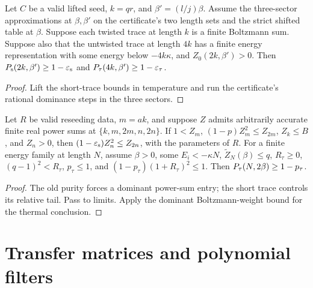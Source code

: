 \begin{theorem}
  \label{thm:seed-lifted}
  \leanok
  Let \(C\) be a valid lifted seed, \(k=qr\), and \(\beta'=(l/j)\beta\).
  Assume the three-sector approximations at \(\beta,\beta'\) on the certificate's two length
  sets and the strict shifted table at \(\beta\).
  Suppose each twisted trace at length \(k\) is a finite Boltzmann sum.
  Suppose also that the untwisted trace at length \(4k\) has a finite energy representation
  with some energy below \(-4k\kappa\), and \(Z_0(2k,\beta')>0\).
  Then \(P_{\mathrm{s}}(2k,\beta')\ge1-\varepsilon_{\mathrm{s}}\) and \(P_{\tau}(4k,\beta')\ge1-\varepsilon_{\tau}\).
\end{theorem}
\begin{proof}
  \leanok
  Lift the short-trace bounds in temperature and run the certificate's rational dominance
  steps in the three sectors.
\end{proof}

\begin{theorem}
  \label{thm:seed-reseed}
  \leanok
  Let \(R\) be valid reseeding data, \(m=ak\), and suppose \(Z\) admits arbitrarily accurate
  finite real power sums at \(\{k,m,2m,n,2n\}\).
  If \(1<Z_m\), \((1-p)Z_m^2\le Z_{2m}\), \(Z_k\le B\), and \(Z_n>0\), then
  \((1-\varepsilon_{\mathrm{s}})Z_n^2\le Z_{2n}\), with the parameters of \(R\).
  For a finite energy family at length \(N\), assume \(\beta>0\), some \(E_i<-\kappa N\),
  \(\widetilde Z_N(\beta)\le q\), \(R_\tau\ge0\), \((q-1)^2<R_\tau\),
  \(p_\tau\le1\), and \((1-p_\tau)(1+R_\tau)^2\le1\).
  Then \(P_{\tau}(N,2\beta)\ge1-p_\tau\).
\end{theorem}
\begin{proof}
  \leanok
  The old purity forces a dominant power-sum entry; the short trace controls its relative tail.
  Pass to limits. Apply the dominant Boltzmann-weight bound for the thermal conclusion.
\end{proof}

\section{Transfer matrices and polynomial filters}

